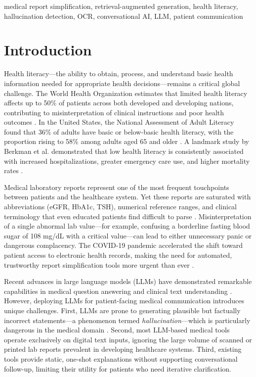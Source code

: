 \documentclass[conference]{IEEEtran}
\begin{document}
\begin{IEEEkeywords}
medical report simplification, retrieval-augmented generation, health literacy, hallucination detection, OCR, conversational AI, LLM, patient communication
\end{IEEEkeywords}

\section{Introduction}

Health literacy---the ability to obtain, process, and understand basic health information needed for appropriate health decisions---remains a critical global challenge. The World Health Organization estimates that limited health literacy affects up to 50\% of patients across both developed and developing nations, contributing to misinterpretation of clinical instructions and poor health outcomes \cite{who2013health}. In the United States, the National Assessment of Adult Literacy found that 36\% of adults have basic or below-basic health literacy, with the proportion rising to 58\% among adults aged 65 and older \cite{kutner2006health}. A landmark study by Berkman et al. demonstrated that low health literacy is consistently associated with increased hospitalizations, greater emergency care use, and higher mortality rates \cite{berkman2011low}.

Medical laboratory reports represent one of the most frequent touchpoints between patients and the healthcare system. Yet these reports are saturated with abbreviations (eGFR, HbA1c, TSH), numerical reference ranges, and clinical terminology that even educated patients find difficult to parse \cite{brega2015ahrq}. Misinterpretation of a single abnormal lab value---for example, confusing a borderline fasting blood sugar of 108 mg/dL with a critical value---can lead to either unnecessary panic or dangerous complacency. The COVID-19 pandemic accelerated the shift toward patient access to electronic health records, making the need for automated, trustworthy report simplification tools more urgent than ever \cite{adler2020accessibility}.

Recent advances in large language models (LLMs) have demonstrated remarkable capabilities in medical question answering and clinical text understanding \cite{singhal2023large, nori2023capabilities}. However, deploying LLMs for patient-facing medical communication introduces unique challenges. First, LLMs are prone to generating plausible but factually incorrect statements---a phenomenon termed \textit{hallucination}---which is particularly dangerous in the medical domain \cite{ji2023survey}. Second, most LLM-based medical tools operate exclusively on digital text inputs, ignoring the large volume of scanned or printed lab reports prevalent in developing healthcare systems. Third, existing tools provide static, one-shot explanations without supporting conversational follow-up, limiting their utility for patients who need iterative clarification.
\end{document}
